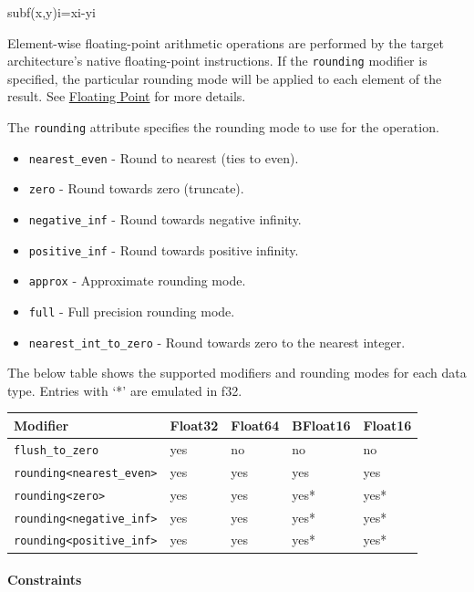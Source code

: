 \documentclass{article}
\begin{document}
subf(x,y)i=xi-yi

Element-wise floating-point arithmetic operations are performed by the target architecture's native floating-point instructions. If the \texttt{rounding} modifier is specified, the particular rounding mode will be applied to each element of the result. See \href{https://docs.nvidia.com/cuda/tile-ir/latest/sections/operations.html#op-group-floating-point}{Floating Point} for more details.


The \texttt{rounding} attribute specifies the rounding mode to use for the operation.


\begin{itemize}
\item \texttt{nearest\_even} - Round to nearest (ties to even).
\item \texttt{zero} - Round towards zero (truncate).
\item \texttt{negative\_inf} - Round towards negative infinity.
\item \texttt{positive\_inf} - Round towards positive infinity.
\item \texttt{approx} - Approximate rounding mode.
\item \texttt{full} - Full precision rounding mode.
\item \texttt{nearest\_int\_to\_zero} - Round towards zero to the nearest integer.

\end{itemize}
The below table shows the supported modifiers and rounding modes for each data type. Entries with `*' are emulated in f32.


\begin{longtable}{l|l|l|l|l}
\hline
Modifier & Float32 & Float64 & BFloat16 & Float16 \\ \hline
\texttt{flush\_to\_zero} & yes & no & no & no \\ \hline
\texttt{rounding<nearest\_even>} & yes & yes & yes & yes \\ \hline
\texttt{rounding<zero>} & yes & yes & yes* & yes* \\ \hline
\texttt{rounding<negative\_inf>} & yes & yes & yes* & yes* \\ \hline
\texttt{rounding<positive\_inf>} & yes & yes & yes* & yes* \\ \hline
\end{longtable}


\paragraph{Constraints}
\end{document}
